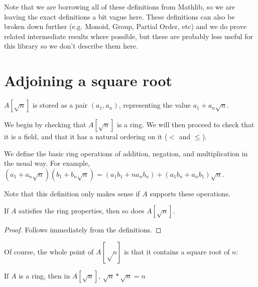 Note that we are borrowing all of these definitions from Mathlib, so we are
leaving the exact definitions a bit vague here.  These definitions can also be
broken down further (e.g. Monoid, Group, Partial Order, etc) and we do prove
related intermediate results where possible, but these are probably less useful
for this library so we don't describe them here.

\section{Adjoining a square root}


\begin{definition}
  \label{def:adjoin}
  \leanok
  $A[\sqrt{n}]$ is stored as a pair $(a_1, a_n)$, representing the value
  $a_1 + a_n\sqrt{n}$.
\end{definition}

We begin by checking that $A[\sqrt{n}]$ is a ring. We will then proceed to check
that it is a field, and that it has a natural ordering on it ($<$ and $≤$).

\begin{definition}
  \label{def:adjoinRingOps}
  \leanok
  We define the basic ring operations of addition, negation, and multiplication
  in the usual way.
  For example, $(a_1 + a_n\sqrt{n})(b_1 + b_n\sqrt{n}) = (a_1b_1 + na_nb_n) + (a_1b_n + a_nb_1)\sqrt{n}$.

  Note that this definition only makes sense if $A$ supports these operations.
\end{definition}


\begin{proposition}
  \label{thm:adjoinRing}
  \leanok
  If $A$ satisfies the ring properties, then so does $A[\sqrt{n}]$.
\end{proposition}

\begin{proof}
  \leanok
  Follows immediately from the definitions.
\end{proof}


Of course, the whole point of $A[√n]$ is that it contains a square root of $n$:
\begin{theorem}
  \label{thm:adjoinHasSqrtN}
  \leanok
  If $A$ is a ring, then in $A[\sqrt{n}]$, $\sqrt{n} * \sqrt{n} = n$
\end{theorem}

